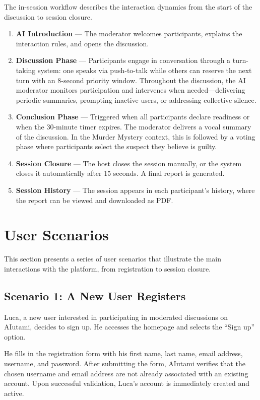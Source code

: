 The in-session workflow describes the interaction dynamics from the start of the discussion to session closure.

\begin{enumerate}
    \item \textbf{AI Introduction} --- The moderator welcomes participants, explains the interaction rules, and opens the discussion.
    \item \textbf{Discussion Phase} --- Participants engage in conversation through a turn-taking system: one speaks via push-to-talk while others can reserve the next turn with an 8-second priority window. Throughout the discussion, the AI moderator monitors participation and intervenes when needed---delivering periodic summaries, prompting inactive users, or addressing collective silence.
    \item \textbf{Conclusion Phase} --- Triggered when all participants declare readiness or when the 30-minute timer expires. The moderator delivers a vocal summary of the discussion. In the Murder Mystery context, this is followed by a voting phase where participants select the suspect they believe is guilty.
    \item \textbf{Session Closure} --- The host closes the session manually, or the system closes it automatically after 15 seconds. A final report is generated.
    \item \textbf{Session History} --- The session appears in each participant's history, where the report can be viewed and downloaded as PDF.
\end{enumerate}

\section{User Scenarios}

This section presents a series of user scenarios that illustrate the main interactions with the platform, from registration to session closure.

\subsection{Scenario 1: A New User Registers}

Luca, a new user interested in participating in moderated discussions on AIutami, decides to sign up. He accesses the homepage and selects the ``Sign up'' option.

He fills in the registration form with his first name, last name, email address, username, and password. After submitting the form, AIutami verifies that the chosen username and email address are not already associated with an existing account. Upon successful validation, Luca's account is immediately created and active.


